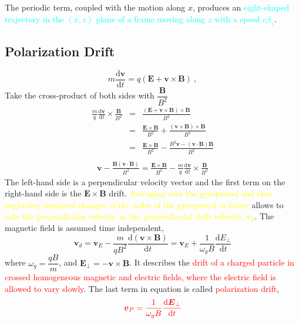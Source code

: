 \documentclass[12pt,a4paper]{article}
\renewcommand{\vec}[1]{\boldsymbol{#1}}
\newcommand{\dif}{\mathrm{d}}
\begin{document}
The periodic term, coupled with the motion along $x$, produces an \textcolor{cyan}{eight-shaped trajectory in the $(x,z)$ plane of a frame moving along $z$ with a speed $c\beta_z$}.


\subsection{Polarization Drift}
\cite{1996bspp.book.....B}
\begin{equation}
m\frac{\dif \vec{v}}{\dif t} = q(\vec{E} +\vec{v} \times \vec{B}) ~,
\end{equation}
Take the cross-product of both sides with $\dfrac{\vec{B} }{B^2}$
\begin{eqnarray*}
\frac{m}{q}\frac{\dif \vec{v}}{\dif t} \times \frac{\vec{B} }{B^2} &=& \frac{(\vec{E} +\vec{v} \times \vec{B}) \times \vec{B} }{B^2}  \\
&=& \frac{\vec{E} \times \vec{B} }{B^2} + \frac{(\vec{v} \times \vec{B}) \times\vec{B} }{B^2} \\
&=& \frac{\vec{E} \times \vec{B} }{B^2} -\frac{ B^2 \vec{v} -(\vec{v} \cdot \vec{B})  \vec{B} }{B^2} \\
\end{eqnarray*}
\begin{eqnarray*}
\vec{v} -\frac{ \vec{B}(\vec{v} \cdot \vec{B}) }{B^2} = \frac{\vec{E} \times \vec{B} }{B^2} -\frac{m}{q}\frac{\dif \vec{v}}{\dif t} \times \frac{\vec{B} }{B^2}
\end{eqnarray*}
The left-hand side is a perpendicular velocity vector and the first term on the right-hand side is the $\vec{E} \times \vec{B}$ drift. \textcolor{yellow}{Averaging over the gyroperiod and thus neglecting temporal changes of the order of the gyroperiod or faster} allows to \textcolor{yellow}{take the perpendicular velocity as the perpendicular drift velocity, $\vec{v}_d$}. The magnetic field is assumed time independent,
\begin{equation}
\vec{v}_d = \vec{v}_E - \frac{m}{qB^2} \frac{\dif (\vec{v} \times \vec{B}) }{\dif t} = \vec{v}_E +\frac{1}{\omega_g B} \frac{\dif E_\perp}{\dif t}
\end{equation}
 where $\omega_g = \dfrac{qB}{m}$, and $\vec{E}_\perp = -\vec{v} \times \vec{B}$. It describes the \textcolor{red}{drift of a charged particle in crossed homogeneous magnetic and electric fields, where the electric field is allowed to vary slowly}. The last term in equation is called \textcolor{red}{polarization drift},
\begin{equation}
\color{red} \vec{v}_P = \frac{1}{\omega_g B} \frac{\dif \vec{E}_\perp}{\dif t}
\end{equation}
\end{document}

